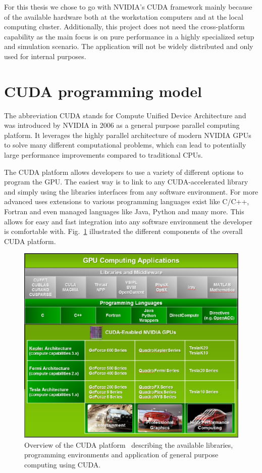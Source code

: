 For this thesis we chose to go with NVIDIA's CUDA framework mainly because of the available hardware both at the workstation computers and at the local computing cluster. Additionally, this project does not need the cross-platform capability as the main focus is on pure performance in a highly specialized setup and simulation scenario. The application will not be widely distributed and only used for internal purposes.

\section{CUDA programming model}
\label{sec:CUDA}
The abbreviation CUDA stands for Compute Unified Device Architecture and was introduced by NVIDIA in 2006 as a general purpose parallel computing platform. It leverages the highly parallel architecture of modern NVIDIA GPUs to solve many different computational problems, which can lead to potentially large performance improvements compared to traditional CPUs.

The CUDA platform allows developers to use a variety of different options to program the GPU. The easiest way is to link to any CUDA-accelerated library and simply using the libraries interfaces from any software environment. For more advanced uses extensions to various programming languages exist like C/C++, Fortran and even managed languages like Java, Python and many more. This allows for easy and fast integration into any software environment the developer is comfortable with. Fig.~\ref{fig:cuda_overview} illustrated the different components of the overall CUDA platform.

\begin{figure}[!htbp]
  \centering
  \includegraphics[width=.9\textwidth]{img/cuda_overview.pdf}
  \caption[Overview of the CUDA platform.]{Overview of the CUDA platform~\cite{CudaProgrammingGuide} describing the available libraries, programming environments and application of general purpose computing using CUDA.}
  \label{fig:cuda_overview}
\end{figure}

